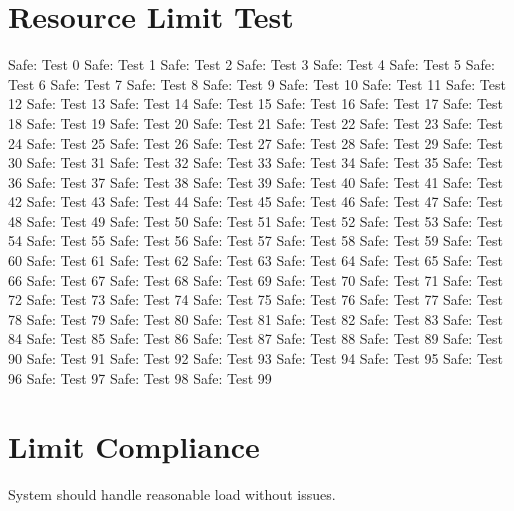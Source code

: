 \documentclass{article}
\begin{document}
\section{Resource Limit Test}
\newcommand{\safe}[1]{Safe: #1}
\safe{Test 0}
\safe{Test 1}
\safe{Test 2}
\safe{Test 3}
\safe{Test 4}
\safe{Test 5}
\safe{Test 6}
\safe{Test 7}
\safe{Test 8}
\safe{Test 9}
\safe{Test 10}
\safe{Test 11}
\safe{Test 12}
\safe{Test 13}
\safe{Test 14}
\safe{Test 15}
\safe{Test 16}
\safe{Test 17}
\safe{Test 18}
\safe{Test 19}
\safe{Test 20}
\safe{Test 21}
\safe{Test 22}
\safe{Test 23}
\safe{Test 24}
\safe{Test 25}
\safe{Test 26}
\safe{Test 27}
\safe{Test 28}
\safe{Test 29}
\safe{Test 30}
\safe{Test 31}
\safe{Test 32}
\safe{Test 33}
\safe{Test 34}
\safe{Test 35}
\safe{Test 36}
\safe{Test 37}
\safe{Test 38}
\safe{Test 39}
\safe{Test 40}
\safe{Test 41}
\safe{Test 42}
\safe{Test 43}
\safe{Test 44}
\safe{Test 45}
\safe{Test 46}
\safe{Test 47}
\safe{Test 48}
\safe{Test 49}
\safe{Test 50}
\safe{Test 51}
\safe{Test 52}
\safe{Test 53}
\safe{Test 54}
\safe{Test 55}
\safe{Test 56}
\safe{Test 57}
\safe{Test 58}
\safe{Test 59}
\safe{Test 60}
\safe{Test 61}
\safe{Test 62}
\safe{Test 63}
\safe{Test 64}
\safe{Test 65}
\safe{Test 66}
\safe{Test 67}
\safe{Test 68}
\safe{Test 69}
\safe{Test 70}
\safe{Test 71}
\safe{Test 72}
\safe{Test 73}
\safe{Test 74}
\safe{Test 75}
\safe{Test 76}
\safe{Test 77}
\safe{Test 78}
\safe{Test 79}
\safe{Test 80}
\safe{Test 81}
\safe{Test 82}
\safe{Test 83}
\safe{Test 84}
\safe{Test 85}
\safe{Test 86}
\safe{Test 87}
\safe{Test 88}
\safe{Test 89}
\safe{Test 90}
\safe{Test 91}
\safe{Test 92}
\safe{Test 93}
\safe{Test 94}
\safe{Test 95}
\safe{Test 96}
\safe{Test 97}
\safe{Test 98}
\safe{Test 99}
\section{Limit Compliance}
System should handle reasonable load without issues.
\end{document}
